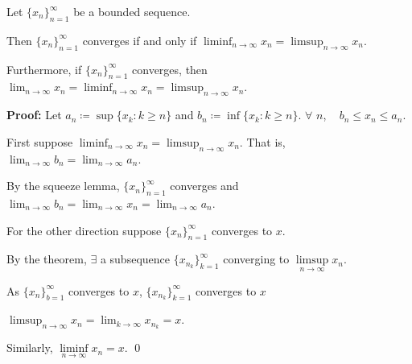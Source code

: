 \documentclass[10pt,aspectratio=149]{beamer}
\begin{document}
\begin{frame}
\begin{proposition}
Let $\{ x_n \}_{n=1}^\infty$ be a bounded sequence.

\pause
Then $\{ x_n \}_{n=1}^\infty$ converges
if and only if
\quad
$\displaystyle
\liminf_{n\to \infty} x_n =
\limsup_{n\to \infty} x_n$.

\pause
Furthermore, if $\{ x_n \}_{n=1}^\infty$ converges, then
\quad
$\displaystyle
\lim_{n\to \infty} x_n =
\liminf_{n\to \infty} x_n =
\limsup_{n\to \infty} x_n$.
\end{proposition}

\pause
\textbf{Proof:}
Let $a_n \coloneqq \sup \{ x_k : k \geq n \}$ and $b_n \coloneqq \inf \{ x_k : k \geq n \}$.
\pause
\quad
$\forall$ $n$, ~
$b_n \leq x_n \leq a_n$.

\pause
\medskip

First suppose $\displaystyle \liminf_{n\to\infty} x_n = \limsup_{n\to\infty} x_n$.  That is,
$\displaystyle \lim_{n\to\infty} b_n = \lim_{n\to\infty} a_n$.

\pause
\medskip

By the squeeze lemma,
$\{ x_n \}_{n=1}^\infty$ converges and
\quad $\displaystyle
\lim_{n\to\infty} b_n
=
\lim_{n\to\infty} x_n
=
\lim_{n\to\infty} a_n$.

\pause
\medskip

For the other direction suppose $\{ x_n \}_{n=1}^\infty$ converges to $x$.

\pause
\medskip

By the theorem, $\exists$ a subsequence
$\{ x_{n_k} \}_{k=1}^\infty$ converging to $\limsup\limits_{n\to\infty} x_n$.

\pause
As $\{ x_n \}_{b=1}^\infty$ converges to $x$,
\quad $\{ x_{n_k} \}_{k=1}^\infty$ converges to $x$

\pause
\thus \quad $\displaystyle \limsup_{n\to\infty} x_n = \lim_{k\to\infty} x_{n_k} = x$.

\pause
\medskip

Similarly, $\liminf\limits_{n\to\infty} x_n = x$.
\qed


\end{frame}
\end{document}
